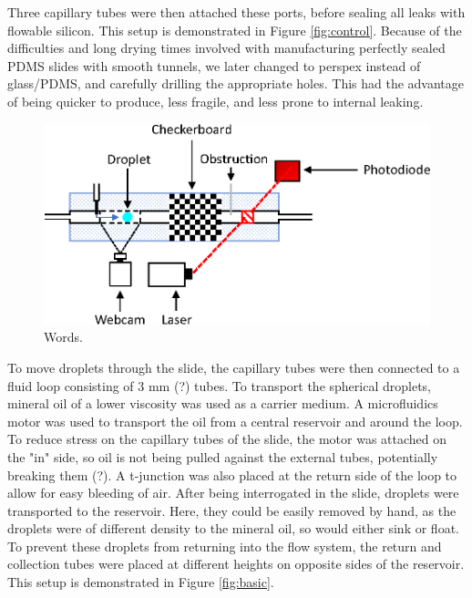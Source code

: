 \documentclass{physics_article_B}
\begin{document}
        Three capillary tubes were then attached these ports, before sealing all leaks with flowable silicon. This setup is demonstrated in Figure \ref{fig:control}. Because of the difficulties and long drying times involved with manufacturing perfectly sealed PDMS slides with smooth tunnels, we later changed to perspex instead of glass/PDMS, and carefully drilling the appropriate holes. This had the advantage of being quicker to produce, less fragile, and less prone to internal leaking. 
        
            \begin{figure}[H]
            \centering
            \hspace*{2cm}\includegraphics[scale=0.9]{Figures/Control.eps}
            \captionsetup{justification=centering}
            \caption{Words.} 	
            \label{fig:slide}
            \end{figure} 
    
        To move droplets through the slide, the capillary tubes were then connected to a fluid loop consisting of 3 mm (?) tubes. To transport the spherical droplets, mineral oil of a lower viscosity was used as a carrier medium. A microfluidics motor was used to transport the oil from a central reservoir and around the loop. To reduce stress on the capillary tubes of the slide, the motor was attached on the "in" side, so oil is not being pulled against the external tubes, potentially breaking them (?). A t-junction was also placed at the return side of the loop to allow for easy bleeding of air. After being interrogated in the slide, droplets were transported to the reservoir. Here, they could be easily removed by hand, as the droplets were of different density to the mineral oil, so would either sink or float. To prevent these droplets from returning into the flow system, the return and collection tubes were placed at different heights on opposite sides of the reservoir. This setup is demonstrated in Figure \ref{fig:basic}.
        
\end{document}
